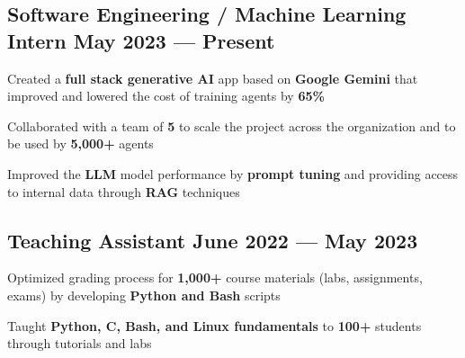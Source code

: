 
\subsection{{Software Engineering / Machine Learning Intern \hfill May 2023 --- Present}}
\begin{zitemize}
    \item Created a \textbf{full stack generative AI} app based on \textbf{Google Gemini} that improved and lowered the cost of training agents by \textbf{65\%}
    \item Collaborated with a team of \textbf{5} to scale the project across the organization and to be used by \textbf{5,000+} agents
    \item Improved the \textbf{LLM} model performance by \textbf{prompt tuning} and providing access to internal data through \textbf{RAG} techniques
\end{zitemize}


\vspace{0.3cm}\subsection{{Teaching Assistant \hfill June 2022 --- May 2023}}
\begin{zitemize}
    \item Optimized grading process for \textbf{1,000+} course materials (labs, assignments, exams) by developing \textbf{Python and Bash} scripts
    \item Taught \textbf{Python, C, Bash, and Linux fundamentals} to \textbf{100+} students through tutorials and labs
\end{zitemize}


